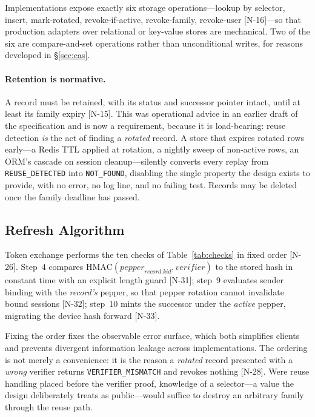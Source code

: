 \documentclass[11pt]{article}
\begin{document}
Implementations expose exactly six storage operations---lookup by selector,
insert, mark-rotated, revoke-if-active, revoke-family, revoke-user [N-16]---so
that production adapters over relational or key-value stores are mechanical.
Two of the six are compare-and-set operations rather than unconditional
writes, for reasons developed in \S\ref{sec:cas}.

\paragraph{Retention is normative.} A record must be retained, with its
status and successor pointer intact, until at least its family expiry
[N-15]. This was operational advice in an earlier draft of the
specification and is now a requirement, because it is load-bearing: reuse
detection \emph{is} the act of finding a \textit{rotated} record. A store
that expires rotated rows early---a Redis TTL applied at rotation, a nightly
sweep of non-active rows, an ORM's cascade on session cleanup---silently
converts every replay from \texttt{REUSE\_DETECTED} into \texttt{NOT\_FOUND},
disabling the single property the design exists to provide, with no error, no
log line, and no failing test. Records may be deleted once the family
deadline has passed.

\subsection{Refresh Algorithm}
\label{sec:refresh}

Token exchange performs the ten checks of Table~\ref{tab:checks} in fixed
order [N-26]. Step~4 compares
$\mathrm{HMAC}(\mathit{pepper}_{record.kid}, \mathit{verifier})$ to the
stored hash in constant time with an explicit length guard [N-31]; step~9
evaluates sender binding with the \emph{record's} pepper, so that pepper
rotation cannot invalidate bound sessions [N-32]; step~10 mints the
successor under the \emph{active} pepper, migrating the device hash forward
[N-33].

Fixing the order fixes the observable error surface, which both simplifies
clients and prevents divergent information leakage across implementations.
The ordering is not merely a convenience: it is the reason a \textit{rotated}
record presented with a \emph{wrong} verifier returns
\texttt{VERIFIER\_MISMATCH} and revokes nothing [N-28]. Were reuse handling
placed before the verifier proof, knowledge of a selector---a value the
design deliberately treats as public---would suffice to destroy an arbitrary
family through the reuse path.
\end{document}
